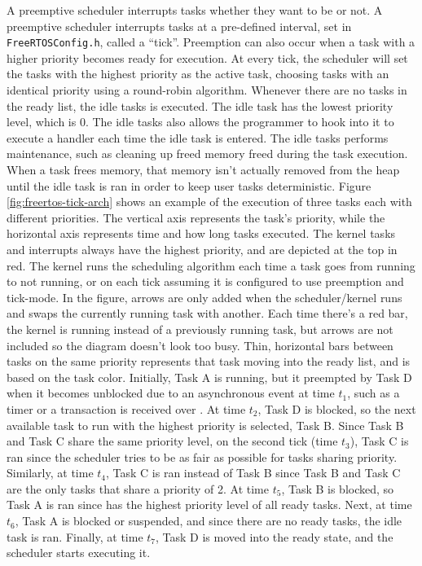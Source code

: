 A preemptive scheduler interrupts tasks whether they want to be or not. A
preemptive scheduler interrupts tasks at a pre-defined interval, set in
\texttt{FreeRTOSConfig.h}, called a ``tick''. Preemption can also occur when a task with
a higher priority becomes ready for execution. At every tick, the scheduler will
set the tasks with the highest priority as the active task, choosing tasks with
an identical priority using a round-robin algorithm. Whenever there are no tasks
in the ready list, the idle tasks is executed. The idle task has the lowest priority
level, which is 0. The idle tasks also allows the programmer to hook into it to execute a
handler each time the idle task is entered. The idle tasks performs maintenance,
such as cleaning up freed memory freed during the task execution. When a task
frees memory, that memory isn't actually removed from the heap until the idle
task is ran in order to keep user tasks deterministic. Figure
\ref{fig:freertos-tick-arch} shows an example of the execution of three tasks
each with different priorities. The vertical axis represents the task's
priority, while the horizontal axis represents time and how long tasks executed.
The kernel tasks and interrupts always have the highest priority, and are
depicted at the top in red. The kernel runs the scheduling algorithm each time a
task goes from running to not running, or on each tick assuming it is configured
to use preemption and tick-mode. In the figure, arrows are only added when the
scheduler/kernel runs and swaps the currently running task with another. Each
time there's a red bar, the kernel is running instead of a previously running
task, but arrows are not included so the diagram doesn't look too busy. Thin,
horizontal bars between tasks on the same priority represents that task moving
into the ready list, and is based on the task color. Initially, Task A
is running, but it preempted by Task D when it becomes unblocked due to
an asynchronous event at time $t_1$, such as a timer or a transaction is
received over \iic. At time $t_2$, Task D is blocked, so the next
available task to run with the highest priority is selected, Task B.
Since Task B and Task C share the same priority level, on the
second tick (time $t_3$), Task C is ran since the scheduler tries to
be as fair as possible for tasks sharing priority.  Similarly, at time
$t_4$, Task C is ran instead of Task B since Task B and
Task C are the only tasks that share a priority of 2. At time $t_5$,
Task B is blocked, so Task A is ran since has the highest priority
level of all ready tasks.  Next, at time $t_6$, Task A is blocked or
suspended, and since there are no ready tasks, the idle task is ran. Finally, at
time $t_7$, Task D is moved into the ready state, and the scheduler
starts executing it.

